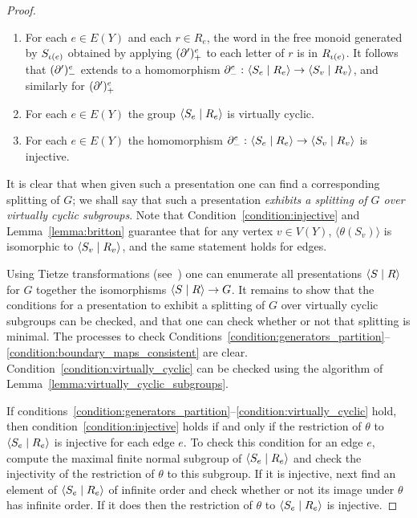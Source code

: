 \begin{proof}
\begin{enumerate}
  \item\label{condition:boundary_maps_consistent} For each $e \in E(Y)$ and each $r \in R_e$, the word in the free monoid generated by $S_{\operatorname{\iota}(e)}$ obtained by applying $(\partial')^e_{+}$ to each letter of $r$ is in $R_{\operatorname{\iota}(e)}$.
    It follows that $(\partial')^e_{-}$ extends to a homomorphism $\partial^e_{-} \operatorname{\colon} \langle S_e \mid R_e\rangle \to \langle S_v \mid R_v\rangle$, and similarly for $(\partial')^{e}_{+}$
  \item\label{condition:virtually_cyclic} For each $e \in E(Y)$ the group $\langle S_e \mid R_e\rangle$ is virtually cyclic.
  \item\label{condition:injective} For each $e \in E(Y)$ the homomorphism $\partial^e_{-} \operatorname{\colon} \langle S_e \mid R_e\rangle \to \langle S_v \mid R_v\rangle$ is injective.
\end{enumerate}
It is clear that when given such a presentation one can find a corresponding splitting of $G$; we shall say that such a presentation \emph{exhibits a splitting of $G$ over virtually cyclic subgroups}.
Note that Condition~\ref{condition:injective} and Lemma~\ref{lemma:britton} guarantee that for any vertex $v \in V(Y)$, $\langle \theta(S_v)\rangle$ is isomorphic to $\langle S_v \mid R_v\rangle$, and the same statement holds for edges.

Using Tietze transformations (see~\cite[Section 2.2]{lyndonschupp77}) one can enumerate all presentations $\langle S \mid R\rangle$ for $G$ together the isomorphisms $\langle S \mid R\rangle \to G$.
It remains to show that the conditions for a presentation to exhibit a splitting of $G$ over virtually cyclic subgroups can be checked, and that one can check whether or not that splitting is minimal.
The processes to check Conditions~\ref{condition:generators_partition}--\ref{condition:boundary_maps_consistent} are clear.
Condition~\ref{condition:virtually_cyclic} can be checked using the algorithm of Lemma~\ref{lemma:virtually_cyclic_subgroups}.

If conditions~\ref{condition:generators_partition}--\ref{condition:virtually_cyclic} hold, then condition~\ref{condition:injective} holds if and only if the restriction of $\theta$ to $\langle S_e \mid R_e\rangle$ is injective for each edge $e$.
To check this condition for an edge $e$, compute the maximal finite normal subgroup of $\langle S_e \mid R_e\rangle$ and check the injectivity of the restriction of $\theta$ to this subgroup.
If it is injective, next find an element of $\langle S_e \mid R_e\rangle$ of infinite order and check whether or not its image under $\theta$ has infinite order.
If it does then the restriction of $\theta$ to $\langle S_e \mid R_e\rangle$ is injective.


\end{proof}
